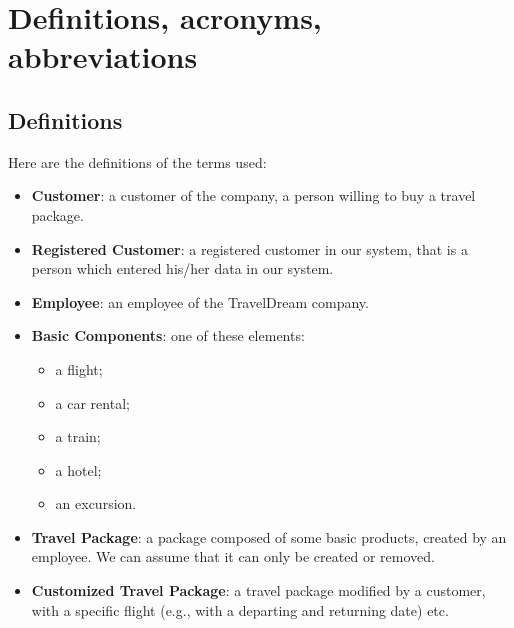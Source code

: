 \documentclass[a4paper,12pt]{book}
\begin{document}
\section{Definitions, acronyms, abbreviations}

\subsection{Definitions}
Here are the definitions of the terms used:
\begin{itemize}
  \item \textbf{Customer}: a customer of the company, a person willing to buy a travel package.
  \item \textbf{Registered Customer}: a registered customer in our system, that is a person which entered his/her data in our system.
  \item \textbf{Employee}: an employee of the TravelDream company.
  \item \textbf{Basic Components}: one of these elements:
  \begin{itemize}
    \item a flight;
    \item a car rental;
    \item a train;
    \item a hotel;
    \item an excursion.
  \end{itemize}
  \item \textbf{Travel Package}: a package composed of some basic products, created by an employee. We can assume that it can only be created or removed.
  \item \textbf{Customized Travel Package}: a travel package modified by a customer, with a specific flight (e.g., with a departing and returning date) etc.
\end{itemize}
\end{document}

